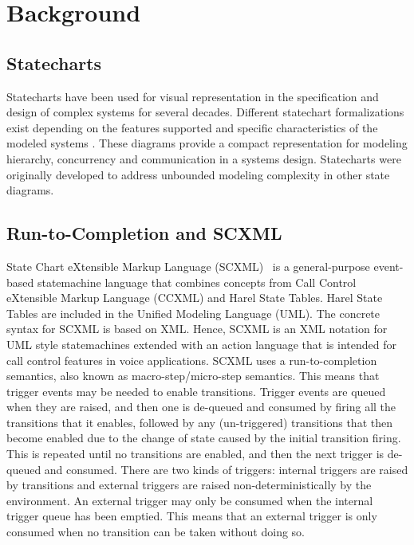 \section{Background}
\label{sec:background}


\subsection{Statecharts}
\label{sec:statecharts}

Statecharts have been used for visual representation in the specification and design of complex systems for several decades. Different statechart formalizations exist depending on the features supported and specific characteristics of the modeled systems \cite{HAREL1987231,harel1996executable,Eshuis_2009}. These diagrams provide a compact representation for modeling hierarchy, concurrency and communication in a systems design.
Statecharts were originally developed to address unbounded modeling complexity in other state diagrams. 

\subsection{Run-to-Completion and SCXML}
\label{sec:run-to-completion}

State Chart eXtensible Markup Language (SCXML)~\cite{Barnett2017,scxmlwebsite} is a 
general-purpose event-based statemachine language that combines concepts 
from Call Control eXtensible Markup Language (CCXML) and Harel State Tables. 
Harel State Tables are included in the Unified Modeling Language (UML). 
The concrete syntax for SCXML is based on XML. Hence, SCXML is an XML 
notation for UML style statemachines extended with an action language 
that is intended for call control features in voice applications. SCXML 
uses a run-to-completion semantics, also known as macro-step/micro-step 
semantics. This means that trigger events may be needed to enable transitions. 
Trigger events are queued when they are raised, and then one is de-queued and
consumed by firing all the transitions that it enables, followed by any 
(un-triggered) transitions that then become enabled due to the change of 
state caused by the initial transition firing. This is repeated until no 
transitions are enabled, and then the next trigger is de-queued and consumed. 
There are two kinds of triggers: internal triggers are raised by transitions
and external triggers are raised non-deterministically by the environment. An external trigger may only be consumed 
when the internal trigger queue has been emptied. This means that an external 
trigger is only consumed when no transition can be taken without doing so.

